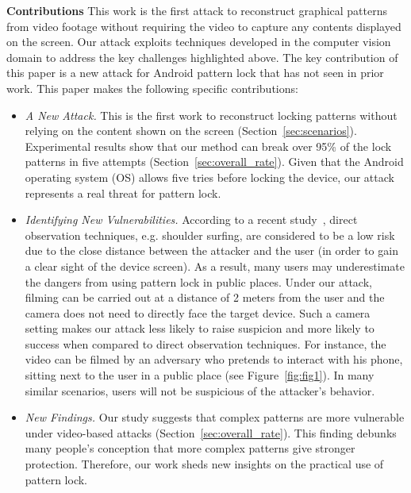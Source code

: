 
\noindent \textbf{Contributions} This work is the first attack to reconstruct graphical patterns from video footage without requiring the video to capture any contents displayed on the screen.
Our attack exploits techniques developed in the computer vision domain to address the key challenges highlighted above.
The key contribution of this paper is a new attack for Android pattern lock that has not seen in prior work. This paper makes the following specific contributions:

\begin{itemize}
\item \emph{A New Attack.}%
This is the first work to reconstruct locking patterns without relying on
the content shown on the screen (Section~\ref{sec:scenarios}). %
Experimental results show that our method can break over
95\% of the lock patterns in five attempts (Section~\ref{sec:overall_rate}). Given that the Android
operating system (OS) allows five tries before
locking the device, our attack represents a real threat for pattern lock.

\item \emph{Identifying New Vulnerabilities.}
According to a recent study~\cite{DBLP:conf/soups/2014}, direct observation techniques, e.g. shoulder surfing, are considered to be a low risk due to the close distance between the attacker and the user (in order to gain a clear sight of the device screen).
As a result, many users may underestimate the dangers from using pattern lock in public places.
Under our attack, filming can be carried out at a distance of 2 meters from the user and the camera does not need to directly face the target device. Such a camera setting makes our attack less likely to raise suspicion and more likely to success when compared to direct observation techniques.
For
instance, the video can be filmed by an adversary who pretends to interact with his phone, sitting next to
the user in a public place (see Figure~\ref{fig:fig1}). In many similar scenarios, users will not be suspicious of the attacker's behavior.

\item \emph{New Findings.} Our study suggests that complex patterns are more vulnerable
under video-based attacks (Section~\ref{sec:overall_rate}). This finding debunks many people's conception
that more complex patterns give stronger protection. Therefore, our work sheds new insights on
 the practical use of pattern lock.

\end{itemize}
